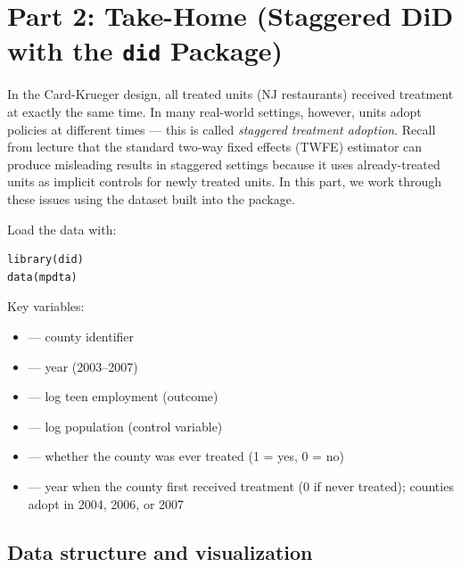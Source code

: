 \newpage

\section{Part 2: Take-Home (Staggered DiD with the \texttt{did} Package)}

In the Card-Krueger design, all treated units (NJ restaurants) received treatment at exactly the same time. In many real-world settings, however, units adopt policies at different times --- this is called \textit{staggered treatment adoption}. Recall from lecture that the standard two-way fixed effects (TWFE) estimator can produce misleading results in staggered settings because it uses already-treated units as implicit controls for newly treated units. In this part, we work through these issues using the  dataset built into the  package.

Load the data with:
\begin{lstlisting}
library(did)
data(mpdta)
\end{lstlisting}

Key variables:
\begin{itemize}
  \item {} --- county identifier
  \item {} --- year (2003--2007)
  \item {} --- log teen employment (outcome)
  \item {} --- log population (control variable)
  \item {} --- whether the county was ever treated (1 = yes, 0 = no)
  \item {} --- year when the county first received treatment (0 if never treated); counties adopt in 2004, 2006, or 2007
\end{itemize}

\subsection{Data structure and visualization}

